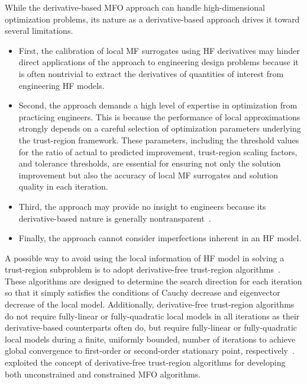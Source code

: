 \documentclass[iicol,sn-basic]{sn-jnl}%
\begin{document}
While the derivative-based MFO approach can handle high-dimensional optimization problems, its nature as a derivative-based approach drives it toward several limitations.
\begin{itemize}
	\item First, the calibration of local MF surrogates using HF derivatives may hinder direct applications of the approach to engineering design problems because it is often nontrivial to extract the derivatives of quantities of interest from engineering HF models.
	
	\item Second, the approach demands a high level of expertise in optimization from practicing engineers.
	This is because the performance of local approximations strongly depends on a careful selection of optimization parameters underlying the trust-region framework.
	These parameters, including the threshold values for the ratio of actual to predicted improvement, trust-region scaling factors, and tolerance thresholds, are essential for ensuring not only the solution improvement but also the accuracy of local MF surrogates and solution quality in each iteration.
	
	\item Third, the approach may provide no insight to engineers because its derivative-based nature is generally nontransparent~\citep{Wang2006}.
	
	\item Finally, the approach cannot consider imperfections inherent in an HF model.
\end{itemize}

A possible way to avoid using the local information of HF model in solving a trust-region subproblem is to adopt derivative-free trust-region algorithms~\citep{Conn2009,Wild2011}.
These algorithms are designed to determine the search direction for each iteration so that it simply satisfies the conditions of Cauchy decrease and eigenvector decrease of the local model.
Additionally, derivative-free trust-region algorithms do not require fully-linear or fully-quadratic local models in all iterations as their derivative-based counterparts often do, but require fully-linear or fully-quadratic local models during a finite, uniformly bounded, number of iterations to achieve global
convergence to first-order or second-order stationary point, respectively~\citep{Conn2009}.
\cite{March2012smo,March2012aiaa} exploited the concept of derivative-free trust-region algorithms for developing both unconstrained and constrained MFO algorithms.
\end{document}
